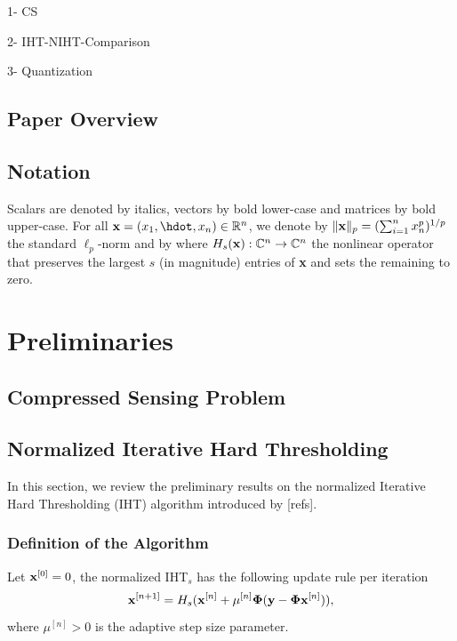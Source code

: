 \documentclass{article}
\begin{document}
1- CS

2- IHT-NIHT-Comparison

3- Quantization

\subsection{Paper Overview}

\subsection{Notation}
Scalars are denoted by italics, vectors by bold lower-case and matrices by bold upper-case. For all ${\bf x}= (x_1, \hdot, x_n) \in \mathbb{R}^n$, we denote by $\|{\bf x}\|_p = (\sum_{i=1}^n x_n^p)^{1/p}$ the standard ${\ell}_p$-norm and by
where $H_s({\bf x}): \mathbb{C}^n \rightarrow \mathbb{C}^n$ the nonlinear operator that preserves the largest $s$ (in magnitude) entries of {\bf x} and sets the remaining to zero. 
\section{Preliminaries}
\subsection{Compressed Sensing Problem}
\subsection{Normalized Iterative Hard Thresholding}
In this section, we review the preliminary results on the normalized Iterative Hard Thresholding (IHT) algorithm introduced by [refs].

\subsubsection{Definition of the Algorithm} 
Let ${\bf x}^{[0]} = 0$, the normalized IHT$_s$ has the following update rule per iteration
\begin{equation}\label{iht_update_rule}
{\bf x}^{[n+1]} = H_s({\bf x}^{[n]} + \mu^{[n]}{\bf \Phi}({\bf y}-{\bf \Phi}{\bf x}^{[n]})),
\end{equation}
where $\mu^{[n]}>0$ is the adaptive step size parameter. %
\end{document}
